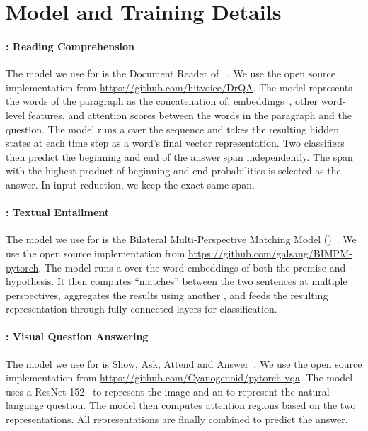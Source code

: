 \appendix
\section{Model and Training Details}
\label{sec:model_supplemental}

\paragraph{\squad{}: Reading Comprehension}
The model we use for \squad{} is the Document Reader of
~\cite{chen2017drqa}. We use the open source
implementation from \url{https://github.com/hitvoice/DrQA}. The model
represents the words of the paragraph as the concatenation of: 
 embeddings~\cite{pennington2014glove}, other word-level
features, and attention scores between the words in the paragraph and
the question. The model runs a  over the sequence and
takes the resulting hidden states at each time step as a word's final
vector representation. Two classifiers then predict the beginning and
end of the answer span independently. The span with the highest
product of beginning and end probabilities is selected as the answer.
In input reduction, we keep the exact same span.

\paragraph{\snli{}: Textual Entailment}
The model we use for \snli{} is the Bilateral Multi-Perspective
Matching Model ()~\cite{wang2017bilateral}.
We use the open source implementation from
\url{https://github.com/galsang/BIMPM-pytorch}. The model runs a
 over the  word embeddings of both
the premise and hypothesis. It then computes ``matches'' between the two
sentences at multiple perspectives, aggregates the results using
another , and feeds the resulting representation
through fully-connected layers for
classification.

\paragraph{\vqa{}: Visual Question Answering}
The model we use for \vqa{} is Show, Ask, Attend and
Answer~\cite{kazemi2017show}.  We use the open source implementation
from \url{https://github.com/Cyanogenoid/pytorch-vqa}.  The model uses
a ResNet-152~\cite{he2016resnet} to represent the image and an
 to represent the natural language question.  The model then
computes attention regions based on the two representations.  All
representations are finally combined to predict the answer.

